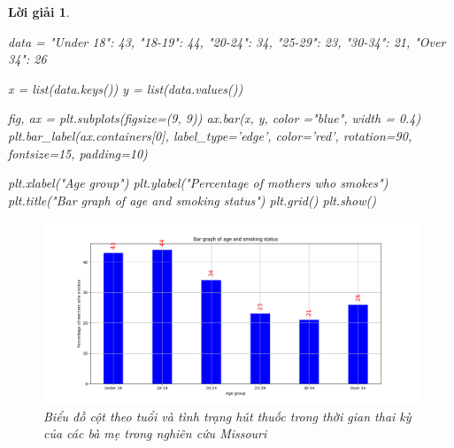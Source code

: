 \documentclass[14pt, a4paper]{article}
\theoremstyle{sltheorem}
\theoremstyle{soltheorem}
\newtheorem*{loigiai}{Lời giải}
\begin{document}
\begin{loigiai}
\begin{enumerate}[wide, labelwidth=!, labelindent=0pt,label=\textbf{\arabic*}.]
\begin{python}
data = {"Under 18": 43, "18-19": 44, "20-24": 34, "25-29": 23, "30-34": 21, "Over 34": 26}

x = list(data.keys())
y = list(data.values())

fig, ax = plt.subplots(figsize=(9, 9))
ax.bar(x, y, color ="blue", width = 0.4)
plt.bar_label(ax.containers[0], label_type='edge', color='red', rotation=90, fontsize=15, padding=10)
 
plt.xlabel("Age group")
plt.ylabel("Percentage of mothers who smokes")
plt.title("Bar graph of age and smoking status")
plt.grid()
plt.show()
        \end{python}

        \begin{figure}[h!]
            \centering
            \includegraphics[scale=0.5]{11.png}
            \caption{Biểu đồ cột theo tuổi và tình trạng hút thuốc trong thời gian thai kỳ của các bà mẹ trong nghiên cứu Missouri}
        \end{figure}
    \end{enumerate}
\end{loigiai}

\newpage
\printbibliography[title={TÀI LIỆU THAM KHẢO}]
\end{document}
